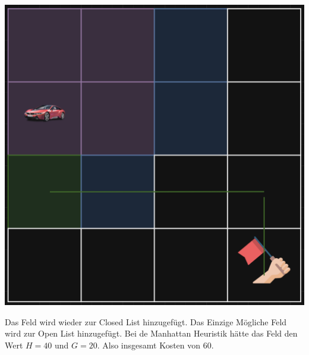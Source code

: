 {
\begin{minipage}{0.4\linewidth}
  \includegraphics[scale=.125]{Cars/img5.png}
\end{minipage}
\begin{minipage}{0.6\linewidth}
Das Feld wird wieder zur Closed List hinzugefügt. Das Einzige Mögliche Feld wird zur Open List hinzugefügt. Bei de Manhattan Heuristik hätte das Feld den Wert \(H=40\) und \(G=20\). Also insgesamt Kosten von 60.
\end{minipage}
}
